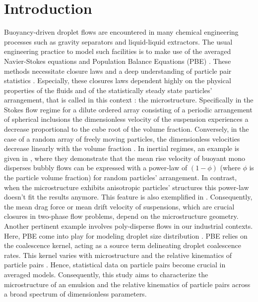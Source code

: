 \section{Introduction}

Buoyancy-driven droplet flows are encountered in many chemical engineering processes such as gravity separators and liquid-liquid extractors. 
The usual engineering practice to model such facilities is to make use of the averaged Navier-Stokes equations and Population Balance Equations (PBE) \citep{castellano2019}. %
These methods necessitate closure laws and a deep understanding of particle pair statistics \citep{simonin1996}.
Especially, these closures laws dependent highly on the physical properties of the fluids and of the statistically steady state particles' arrangement, that is called in this context : the microstructure. 
Specifically in the Stokes flow regime for a dilute ordered array consisting of a periodic arrangement of spherical inclusions the dimensionless velocity of the suspension experiences a decrease proportional to the cube root of the volume fraction. 
Conversely, in the case of a random array of freely moving particles, the dimensionless velocities decrease linearly with the volume fraction \citep{saffman1973}.
In inertial regimes, an example is given in \citet{yin2008lattice}, where they demonstrate that the mean rise velocity of buoyant mono disperses bubbly flows can be expressed with a power-law of $(1-\phi)$ (where $\phi$ is the particle volume fraction) for random particles' arrangement.
In contrast, when the microstructure exhibits anisotropic particles' structures this power-law doesn't fit the results anymore. This feature is also exemplified in \citet{loisy2017}.  
Consequently, the mean drag force or mean drift velocity of suspensions, which are crucial closures in two-phase flow problems, depend on the microstructure geometry.  
Another pertinent example involves poly-disperse flows in our industrial contexts. Here, PBE come into play for modeling droplet size distribution \citep{randolph2012theory}. 
PBE relies on the coalescence kernel, acting as a source term delineating droplet coalescence rates. 
This kernel varies with microstructure and the relative kinematics of particle pairs \citep{chesters1991modelling}.
Hence, statistical data on particle pairs become crucial in averaged models. 
Consequently, this study aims to characterize the microstructure of an emulsion and the relative kinematics of particle pairs across a broad spectrum of dimensionless parameters. %

